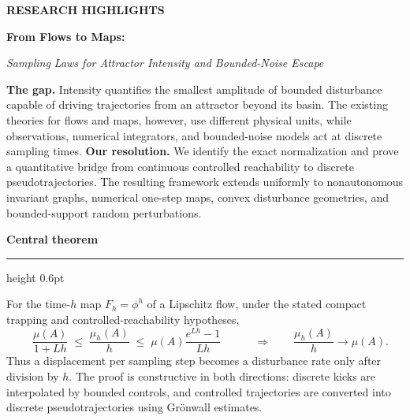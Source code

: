 \documentclass[pdflatex,sn-mathphys-num]{sn-jnl}
\numberwithin{equation}{section}
\newcommand{\pitchsection}[1]{%
  \vspace{0.65em}%
  {\large\bfseries\color{journalblue}#1}\par
  \vspace{0.18em}%
  {\color{rulegray}\hrule height 0.6pt}%
  \vspace{0.38em}%
}
\theoremstyle{thmstyleone}%
\theoremstyle{definition}
\theoremstyle{remark}
\begin{document}


\maketitle


\begingroup
\setlength{\parindent}{0pt}
\setlength{\parskip}{0pt}
\setlength{\fboxsep}{8pt}
\renewcommand{\arraystretch}{1.08}
\vspace{2em}

\newpage

{\small\bfseries\color{accentteal}\MakeUppercase{Research highlights}}
\hfill
\vspace{0.35em}

{\fontsize{21}{23}\selectfont\bfseries\color{journalblue}
From Flows to Maps:}\par
\vspace{0.18em}
{\large\itshape Sampling Laws for Attractor Intensity and Bounded-Noise Escape}\par
\vspace{0.55em}

\colorbox{panelblue}{%
  \parbox{\dimexpr\textwidth-2\fboxsep\relax}{%
    \textbf{The gap.}
    Intensity quantifies the smallest amplitude of bounded disturbance capable
    of driving trajectories from an attractor beyond its basin.  The existing theories for flows
    and maps, however, use different physical units, while observations,
    numerical integrators, and bounded-noise models act at discrete sampling
    times.
    \textbf{Our resolution.}
    We identify the exact normalization and prove a quantitative bridge from
    continuous controlled reachability to discrete pseudotrajectories.  The
    resulting framework extends uniformly to nonautonomous invariant graphs,
    numerical one-step maps, convex disturbance geometries, and bounded-support
    random perturbations.
  }%
}

\pitchsection{Central theorem}

For the time-$h$ map $F_h=\phi^h$ of a Lipschitz flow, under the stated compact
trapping and controlled-reachability hypotheses,
\[
\quad
  \frac{\mu(A)}{1+Lh}
  \;\leq\;
  \frac{\mu_h(A)}{h}
  \;\leq\;
  \mu(A)\frac{e^{Lh}-1}{Lh}
  \quad
  \qquad\Longrightarrow\qquad
  \frac{\mu_h(A)}{h}\longrightarrow\mu(A).
\]
Thus a displacement per sampling step becomes a disturbance rate only after
division by $h$.  The proof is constructive in both directions: discrete kicks
are interpolated by bounded controls, and controlled trajectories are converted
into discrete pseudotrajectories using Gr\"onwall estimates.
\end{document}
